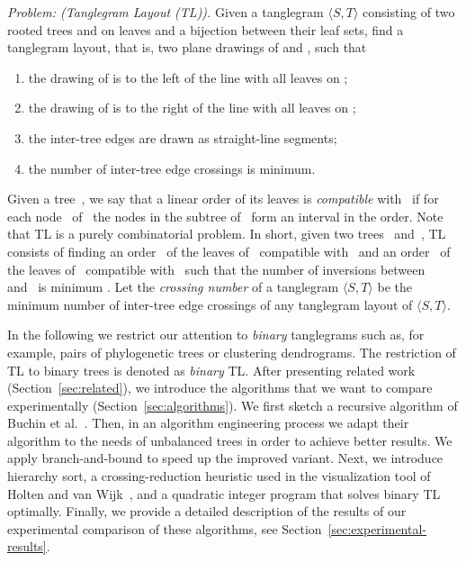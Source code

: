 \documentclass[runningheads,a4paper]{llncs}
\newcommand{\ttree}[1]{\ensuremath{\langle #1 \rangle}}
\begin{document}
\noindent\emph{Problem: (Tanglegram Layout (TL)).}
  Given a tanglegram \ttree{S,T} consisting of two rooted trees 
  and  on  leaves and a bijection between their leaf sets, find a
  tanglegram layout, that is, two plane drawings of  and , such that
  \begin{enumerate}
  \item the drawing of  is to the left of the line 
    with all leaves on ;
  \item the drawing of  is to the right of the line 
    with all leaves on ;
  \item the inter-tree edges are drawn as straight-line segments;
  \item the number of inter-tree edge crossings is minimum.
  \end{enumerate}
\smallskip

Given a tree~, we say that a linear order of its leaves is
\emph{compatible} with~ if for each node~ of~ the nodes in
the subtree of~ form an interval in the order.  Note that TL is a
purely combinatorial problem.  In short, given two trees~ and~,
TL consists of finding an order~ of the leaves of~
compatible with~ and an order~ of the leaves of~
compatible with~ such that the number of inversions between~
and~ is minimum \cite{fkp-ctvcm-05,bbbnow-dbtha-08}.  Let the
\emph{crossing number} of a tanglegram \ttree{S,T} be the minimum
number of inter-tree edge crossings of any tanglegram layout of
\ttree{S,T}.

In the following we restrict our attention to \emph{binary}
tanglegrams such as, for example, pairs of phylogenetic trees or
clustering dendrograms. The restriction of TL to binary trees is
denoted as \emph{binary} TL.  After presenting related work
(Section~\ref{sec:related}), we introduce the algorithms that we want
to compare experimentally (Section~\ref{sec:algorithms}).  We first
sketch a recursive algorithm of Buchin et al.~\cite{bbbnow-dbtha-08}.
Then, in an algorithm engineering process we adapt their algorithm to
the needs of unbalanced trees in order to achieve better results.  We
apply branch-and-bound to speed up the improved variant.  Next, we
introduce hierarchy sort, a crossing-reduction heuristic used in the
visualization tool of Holten and van Wijk~\cite{hw-vchod-08}, and a
quadratic integer program that solves binary TL optimally.  Finally,
we provide a detailed description of the results of our experimental
comparison of these algorithms, see
Section~\ref{sec:experimental-results}.
\end{document}
